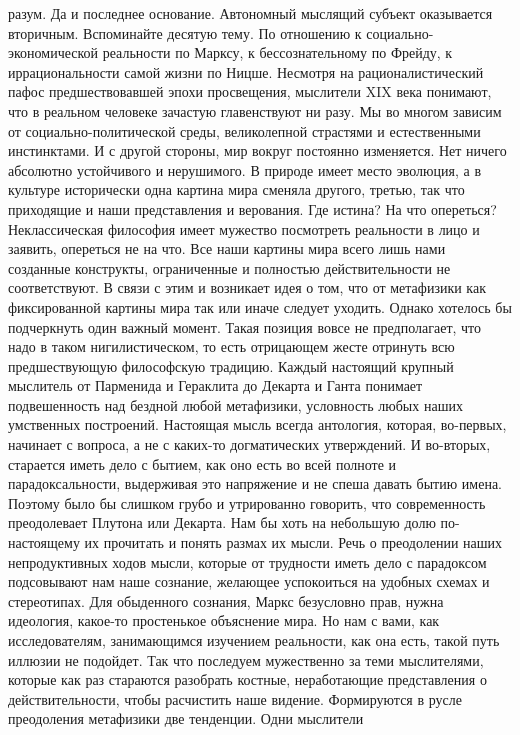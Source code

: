 разум. Да и последнее основание. Автономный мыслящий субъект оказывается
вторичным. Вспоминайте десятую тему. По отношению к социально-экономической
реальности по Марксу, к бессознательному по Фрейду, к иррациональности самой
жизни по Ницше. Несмотря на рационалистический пафос предшествовавшей эпохи
просвещения, мыслители XIX века понимают, что в реальном человеке зачастую
главенствуют ни разу. Мы во многом зависим от социально-политической среды,
великолепной страстями и естественными инстинктами. И с другой стороны, мир
вокруг постоянно изменяется. Нет ничего абсолютно устойчивого и нерушимого. В
природе имеет место эволюция, а в культуре исторически одна картина мира сменяла
другого, третью, так что приходящие и наши представления и верования. Где
истина? На что опереться? Неклассическая философия имеет мужество посмотреть
реальности в лицо и заявить, опереться не на что. Все наши картины мира всего
лишь нами созданные конструкты, ограниченные и полностью действительности не
соответствуют. В связи с этим и возникает идея о том, что от метафизики как
фиксированной картины мира так или иначе следует уходить. Однако хотелось бы
подчеркнуть один важный момент. Такая позиция вовсе не предполагает, что надо в
таком нигилистическом, то есть отрицающем жесте отринуть всю предшествующую
философскую традицию. Каждый настоящий крупный мыслитель от Парменида и
Гераклита до Декарта и Ганта понимает подвешенность над бездной любой
метафизики, условность любых наших умственных построений. Настоящая мысль всегда
антология, которая, во-первых, начинает с вопроса, а не с каких-то догматических
утверждений. И во-вторых, старается иметь дело с бытием, как оно есть во всей
полноте и парадоксальности, выдерживая это напряжение и не спеша давать бытию
имена. Поэтому было бы слишком грубо и утрированно говорить, что современность
преодолевает Плутона или Декарта. Нам бы хоть на небольшую долю по-настоящему их
прочитать и понять размах их мысли. Речь о преодолении наших непродуктивных
ходов мысли, которые от трудности иметь дело с парадоксом подсовывают нам наше
сознание, желающее успокоиться на удобных схемах и стереотипах. Для обыденного
сознания, Маркс безусловно прав, нужна идеология, какое-то простенькое
объяснение мира. Но нам с вами, как исследователям, занимающимся изучением
реальности, как она есть, такой путь иллюзии не подойдет. Так что последуем
мужественно за теми мыслителями, которые как раз стараются разобрать костные,
неработающие представления о действительности, чтобы расчистить наше видение.
Формируются в русле преодоления метафизики две тенденции. Одни мыслители
